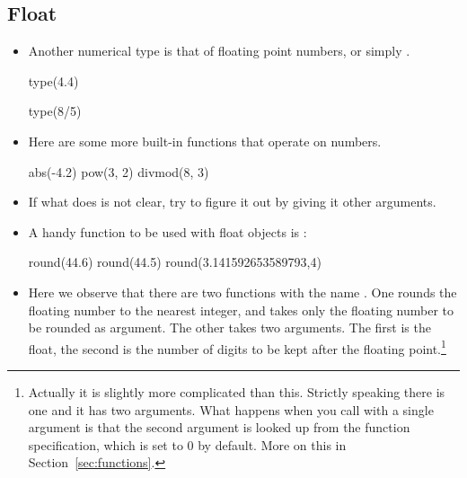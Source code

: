 \documentclass[a4paper]{article}
\begin{document}
\subsection{Float}
\begin{itemize}
\item Another numerical type is that of floating point numbers, or simply
.  

\begin{ucodeframe}
\begin{pyconsole}
type(4.4)
\end{pyconsole}
\end{ucodeframe}

\begin{ucodeframe}
\begin{pyconsole}
type(8/5)
\end{pyconsole}
\end{ucodeframe}

\item Here are some more built-in functions that operate on numbers. 

\begin{ucodeframe}
\begin{pyconsole}
abs(-4.2)
pow(3, 2)
divmod(8, 3)
\end{pyconsole}
\end{ucodeframe}

\item If what  does is not clear, try to figure it out by giving it 
other arguments.

\item A handy function to be used with float objects is
:

\begin{ucodeframe}
\begin{pyconsole}
round(44.6)
round(44.5)
round(3.141592653589793,4)
\end{pyconsole}
\end{ucodeframe}

\item Here we observe that there are two functions with the name .
One rounds the floating number to the nearest integer, and takes only the
floating number to be rounded as argument. The other  takes two
arguments. The first is the float, the second is the number of digits to be kept
after the floating point.\footnote{Actually it is slightly more complicated than
this. Strictly speaking there is one  and it has two arguments. What
happens when you call  with a single argument is that the second
argument is looked up from the function specification, which is set to 
0 by default. More on this in Section~\ref{sec:functions}.}


\end{itemize}
\end{document}

